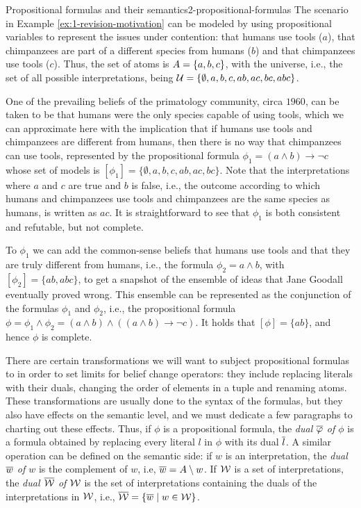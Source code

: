 \begin{xmpl}{Propositional formulas and their semantics}{2-propositional-formulas}
	The scenario in Example \ref{ex:1-revision-motivation}
	can be modeled by using propositional variables 
	to represent the issues under contention:
	that humans use tools ($a$),
	that chimpanzees are part of a different species from humans ($b$)
	and that chimpanzees use tools ($c$).
	Thus, the set of atoms is $A=\{a,b,c\}$, 
	with the universe, i.e., the set of all possible interpretations, 
	being $\mathcal{U}=\{\emptyset,a,b,c,ab,ac,bc,abc\}$.

	One of the prevailing beliefs of the primatology community, 
	circa $1960$, can be taken to be that 
	humans were the only species capable of using tools,
	which we can approximate here with the implication
	that if humans use tools and chimpanzees are different from humans, 
	then there is no way that chimpanzees can use tools,
	represented by the propositional formula 
	$\phi_1 = (a\land b)\rightarrow\lnot c$
	whose set of models is $[\phi_1]=\{\emptyset,a,b,c,ab,ac,bc\}$.
	Note that the interpretations where $a$ and $c$ are true and $b$ is false,
	i.e., the outcome according to which humans and chimpanzees use tools and 
	chimpanzees are the same species as humans, is written as $ac$.
	It is straightforward to see that $\phi_1$ is both consistent and refutable, but not complete. 
	
	To $\phi_1$ we can add the common-sense beliefs that 
	humans use tools and that they are truly different from humans,
	i.e., the formula $\phi_2=a\land b$,
	with $[\phi_2]=\{ab, abc\}$,
	to get a snapshot of the ensemble of ideas 
	that Jane Goodall eventually proved wrong.
	This ensemble can be represented as the
	conjunction of the formulas $\phi_1$ and $\phi_2$,
	i.e., the propositional formula 
	$\phi = \phi_1\land\phi_2 = (a\land b)\land ((a\land b)\rightarrow\lnot c)$.
	It holds that $[\phi]=\{ab\}$, and hence $\phi$ is complete.
\end{xmpl}

There are certain transformations we will want 
to subject propositional formulas to
in order to set limits for belief change operators:
they include replacing literals with their duals,
changing the order of elements in a tuple and renaming atoms.
These transformations are usually done to the syntax of the formulas,
but they also have effects on the semantic level,
and we must dedicate a few paragraphs to charting out these effects.
Thus, if $\phi$ is a propositional formula, 
the \emph{dual $\overline{\varphi}$ of $\phi$}
is a formula obtained by replacing 
every literal $l$ in $\phi$ with its dual $\overline{l}$.
A similar operation can be defined on the semantic side:
if $w$ is an interpretation, the \emph{dual $\overline{w}$ of $w$} 
is the complement of $w$, i.e, $\overline{w} = A\setminus w$.
If $\mathcal{W}$ is a set of interpretations, 
the \emph{dual $\overline{\mathcal{W}}$ of $\mathcal{W}$} is the set of interpretations 
containing the duals of the interpretations in $\mathcal{W}$,
i.e., $\overline{\mathcal{W}} = \{\overline{w}\mid w\in\mathcal{W}\}$.


